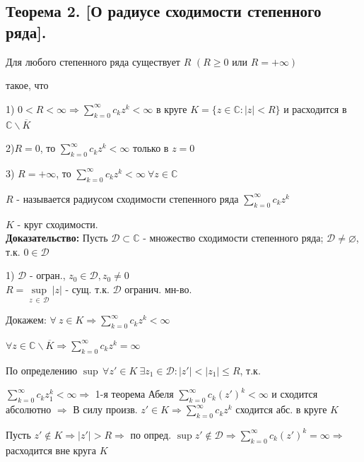 \documentclass[a4paper,12pt]{article} %
\begin{document}
\subsection{Теорема 2. [О радиусе сходимости степенного ряда].}

Для любого степенного ряда существует $R \, \, (R \geqslant 0 \text{ или } R = +\infty)$

 такое, что
 
 1) $0 < R < \infty \Rightarrow \sum\limits_{k = 0}^\infty c_k z^k < \infty$ в круге $K = \{ z \in \mathbb{C} : |z| < R\}$ и расходится в $\mathbb{C} \backslash \overline{K}$
 
 2)$R = 0$, то $\sum\limits_{k = 0}^\infty c_k z^k < \infty$ только в $z = 0$
 
 3) $R = +\infty$, то $\sum\limits_{k = 0}^\infty c_k z^k < \infty \  \forall z \in \mathbb{C}$
 
 $R$ - называется радиусом сходимости степенного ряда $\sum\limits_{k = 0}^\infty c_k z^k$
 
 $K$ - круг сходимости.\\

 \textbf{Доказательство:} Пусть $\mathscr{D} \subset \mathbb{C}$ - множество сходимости степенного ряда; $\mathscr{D} \neq \varnothing$, т.к. $0 \in \mathscr{D}$
 
 1) $\mathscr{D}$ - огран., $z_0 \in \mathscr{D}, z_0 \neq 0$ \\

 $R = \underset{z \, \in \, \mathscr{D}}{\sup} |z| $ - сущ. т.к. $\mathscr{D}$ огранич. мн-во.

 Докажем: $\forall \  z \in K \Rightarrow  \sum\limits_{k = 0}^\infty c_k z^k < \infty$

 $\forall z \in \mathbb{C} \backslash \overline{K} \Rightarrow  \sum\limits_{k = 0}^\infty c_k z^k = \infty$

 По определению $\sup \, \forall z'\in K \  \exists z_1 \in \mathscr{D} : |z'| < |z_1| \leqslant R$, т.к.

 $ \sum\limits_{k = 0}^\infty c_k z_1^k < \infty \Rightarrow$ 1-я теорема Абеля $ \sum\limits_{k = 0}^\infty c_k (z')^k < \infty$ и сходится абсолютно $\Rightarrow$ В силу произв. $z' \in K \Rightarrow  \sum\limits_{k = 0}^\infty c_k z^k$ сходится абс. в круге $K$

 Пусть $z' \notin K \Rightarrow |z'| > R \Rightarrow$ по опред. $\sup z' \notin \mathscr{D} \Rightarrow  \sum\limits_{k = 0}^\infty c_k (z')^k = \infty \Rightarrow$ расходится вне круга $K$
\end{document}
